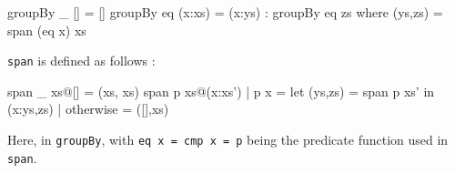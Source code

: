 \documentclass[../main.tex]{subfiles}
\begin{document}
\begin{code}
	groupBy _  []           =  []
	groupBy eq (x:xs)       =  (x:ys) : groupBy eq zs
	where (ys,zs) = span (eq x) xs
\end{code}

\texttt{span} is defined as follows \cite{hstdlib}:

\begin{code}
	span _ xs@[]            =  (xs, xs)
	span p xs@(x:xs')
	| p x          =  let (ys,zs) = span p xs' in (x:ys,zs)
	| otherwise    =  ([],xs)
\end{code}





Here,  in \texttt{groupBy}, with \texttt{eq x = cmp x = p} being the predicate function used in \texttt{span}. %



\end{document}
